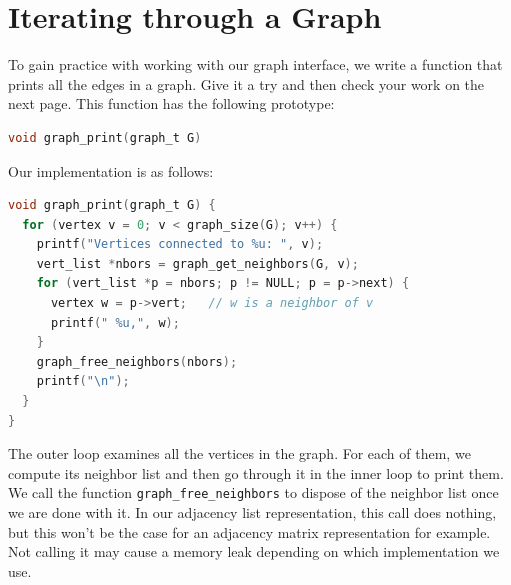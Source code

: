 \section{Iterating through a Graph}
\label{sec:graphs:print_edges}

To gain practice with working with our graph interface, we write a
function that prints all the edges in a graph.  Give it a try and then
check your work on the next page.  This function has the following
prototype:
\begin{lstlisting}[language=c]
void graph_print(graph_t G)
\end{lstlisting}


\newpage
Our implementation is as follows:
\begin{lstlisting}[language=c]
void graph_print(graph_t G) {
  for (vertex v = 0; v < graph_size(G); v++) {
    printf("Vertices connected to %u: ", v);
    vert_list *nbors = graph_get_neighbors(G, v);
    for (vert_list *p = nbors; p != NULL; p = p->next) {
      vertex w = p->vert;   // w is a neighbor of v
      printf(" %u,", w);
    }
    graph_free_neighbors(nbors);
    printf("\n");
  }
}
\end{lstlisting}
The outer loop examines all the vertices in the graph.  For each of
them, we compute its neighbor list and then go through it in the inner
loop to print them.  We call the function
\lstinline'graph_free_neighbors' to dispose of the neighbor list once
we are done with it.  In our adjacency list representation, this
call does nothing, but this won't be the case for an adjacency
matrix representation for example.  Not calling it may cause a memory
leak depending on which implementation we use.

